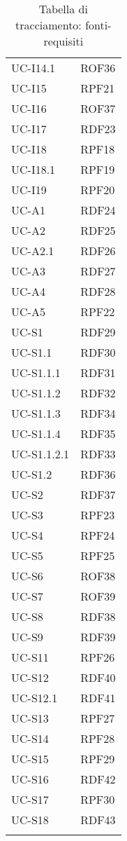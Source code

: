 \begin{longtable}{| p{5cm} | p{5cm} |}
		\rowcolor{LightGray}
		UC-I14.1 & ROF36 \\
		UC-I15 & RPF21 \\
		\rowcolor{LightGray}
		UC-I16 & ROF37 \\
		UC-I17 & RDF23\\
		\rowcolor{LightGray}
		UC-I18 & RPF18\\
		UC-I18.1 & RPF19 \\
		\rowcolor{LightGray}
		UC-I19 & RPF20 \\
		UC-A1 & RDF24\\
		\rowcolor{LightGray}
		UC-A2 & RDF25 \\
		UC-A2.1 & RDF26 \\
		\rowcolor{LightGray}
		UC-A3 & RDF27\\
		UC-A4 & RDF28 \\
		\rowcolor{LightGray}
		UC-A5 & RPF22\\
		UC-S1 & RDF29 \\
		\rowcolor{LightGray}
		UC-S1.1 & RDF30\\
		UC-S1.1.1 & RDF31\\
		\rowcolor{LightGray}
		UC-S1.1.2 & RDF32\\
		UC-S1.1.3 & RDF34\\%
		\rowcolor{LightGray}
		UC-S1.1.4 & RDF35\\%
		UC-S1.1.2.1 & RDF33\\
		\rowcolor{LightGray}
		UC-S1.2 & RDF36\\
		UC-S2 & RDF37\\
		\rowcolor{LightGray}
		UC-S3 & RPF23\\
		UC-S4 & RPF24\\
		\rowcolor{LightGray}
		UC-S5 & RPF25 \\
		UC-S6 & ROF38 \\
		\rowcolor{LightGray}
		UC-S7 & ROF39 \\
		UC-S8 & RDF38 \\
		\rowcolor{LightGray}
		UC-S9 & RDF39 \\
		\rowcolor{LightGray}
		UC-S11 & RPF26 \\
		UC-S12 & RDF40 \\
		\rowcolor{LightGray}
		UC-S12.1 & RDF41 \\
		UC-S13 & RPF27 \\
		\rowcolor{LightGray}
		UC-S14 & RPF28 \\
		UC-S15 & RPF29 \\
		\rowcolor{LightGray} 
		UC-S16 & RDF42\\
		UC-S17 & RPF30\\
		\rowcolor{LightGray}		
		UC-S18 & RDF43\\%
		\hline
		\caption{Tabella di tracciamento: fonti-requisiti}
\end{longtable}

